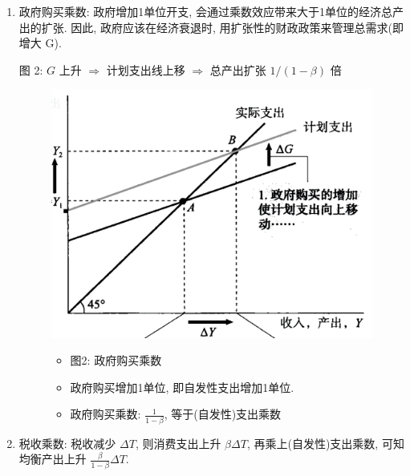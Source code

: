 \documentclass[11pt]{ctexart}
\begin{document}
\begin{enumerate}
\def\labelenumi{\arabic{enumi}.}
\item
  政府购买乘数: 政府增加1单位开支, 会通过乘数效应带来大于1单位的经济总产出的扩张. 因此, 政府应该在经济衰退时, 用扩张性的财政政策来管理总需求(即增大 G). 
  
  图 2: $G$ 上升 $\Rightarrow$ 计划支出线上移 $\Rightarrow$ 总产出扩张 $1/ (1-\beta)$ 倍

\begin{figure}[H]
\centering
\begin{minipage}{.55\textwidth}
  \includegraphics[width=.9\linewidth]{../fig/ch10-1.jpeg}

\end{minipage}%
\begin{minipage}{.4\textwidth}
  \begin{itemize}
  \item 
    图2:  政府购买乘数
  \item 
    政府购买增加1单位, 即自发性支出增加1单位. 
  \item
    政府购买乘数: $\frac{1}{1-\beta}$, 等于(自发性)支出乘数
  \end{itemize}
\end{minipage}
\end{figure}

\item
  税收乘数: 税收减少 $\Delta T$,  则消费支出上升 $\beta \Delta T$, 
  再乘上(自发性)支出乘数, 可知均衡产出上升 $\frac{\beta}{1- \beta} \Delta T $.
  

\end{enumerate}
\end{document}
